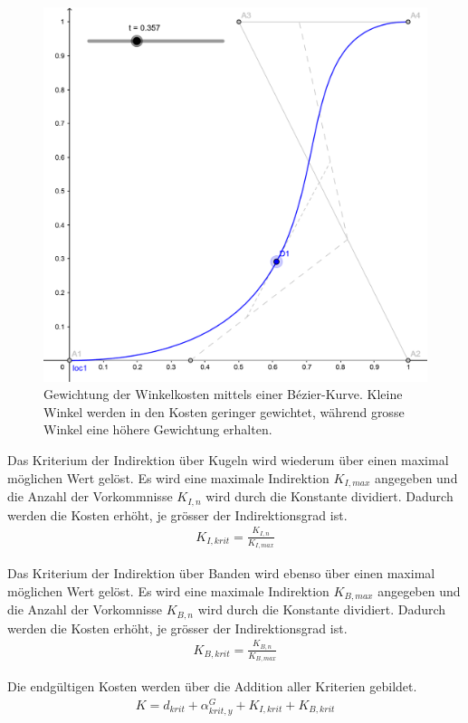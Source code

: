 \begin{figure}[h!]
    \begin{center}
        \includegraphics[width=0.4\linewidth]{../common/03_billiard_ai/resources/30_suchbaum_gewichtung_winkelkosten.png}
    \end{center}
    \caption{Gewichtung der Winkelkosten mittels einer Bézier-Kurve.
    Kleine Winkel werden in den Kosten geringer gewichtet, während grosse Winkel eine höhere Gewichtung erhalten.}
    \label{fig:suche_knoten_gewichtung_winkelkosten}
\end{figure}

Das Kriterium der Indirektion über Kugeln wird wiederum über einen maximal möglichen Wert gelöst.
Es wird eine maximale Indirektion $K_{I,max}$ angegeben und die Anzahl der Vorkommnisse ${K_{I,n}}$ wird durch die
Konstante dividiert. Dadurch werden die Kosten erhöht, je grösser der Indirektionsgrad ist.
\begin{align}
    K_{I,krit} = \frac{K_{I,n}}{K_{I,max}}
\end{align}

Das Kriterium der Indirektion über Banden wird ebenso über einen maximal möglichen Wert gelöst.
Es wird eine maximale Indirektion $K_{B,max}$ angegeben und die Anzahl der Vorkomnisse ${K_{B,n}}$ wird durch die
Konstante dividiert. Dadurch werden die Kosten erhöht, je grösser der Indirektionsgrad ist.
\begin{align}
    K_{B,krit} = \frac{K_{B,n}}{K_{B,max}}
\end{align}

Die endgültigen Kosten werden über die Addition aller Kriterien gebildet.
\begin{align}
    K = d_{krit} + \alpha^G_{krit, y} + K_{I,krit} + K_{B,krit}
\end{align}

